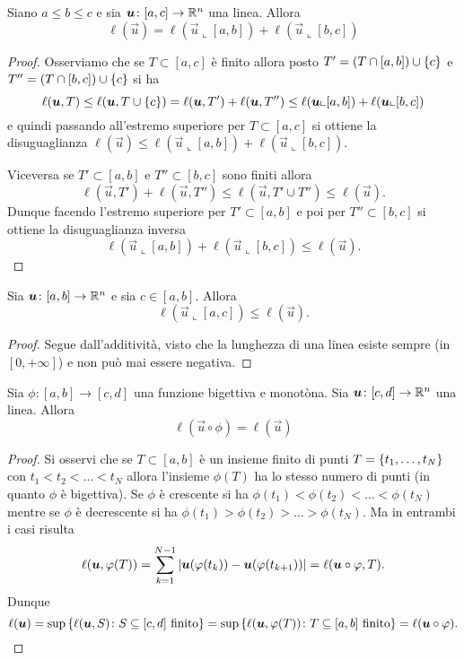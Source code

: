 \begin{theorem}
  Siano $a\le b \le c$ e sia $\boldsymbol u\colon [a,c]\to {\mathbb R}^n$ una linea.
  Allora%
  \begin{equation}\label{eq:ell_additivo}
  \ell(\vec u ) = \ell(\vec u\llcorner[a,b]) + \ell(\vec u\llcorner[b,c])  
  \end{equation}
\end{theorem}
\begin{proof}
Osserviamo che se $T\subset[a,c]$ è finito allora 
posto $T'=(T\cap[a,b])\cup{\left\{ c \right\}}$ e $T''=(T\cap[b,c])\cup {\left\{ c \right\}}$
si ha
\[
\ell(\boldsymbol u, T) \le \ell(\boldsymbol u, T\cup{\left\{ c \right\}})
=\ell(\boldsymbol u,T') + \ell(\boldsymbol u,T'')  
\le \ell(\boldsymbol u\llcorner [a,b]) + \ell(\boldsymbol u\llcorner [b,c])
\]
e quindi passando all'estremo superiore per $T\subset [a,c]$ 
si ottiene la disuguaglianza
$\ell(\vec u)\le \ell(\vec u\llcorner [a,b]) + \ell(\vec u\llcorner[b,c])$.

Viceversa se $T'\subset [a,b]$ e $T''\subset [b,c]$ sono finiti 
allora 
\[
 \ell(\vec u, T') + \ell(\vec u, T'')
 \le \ell(\vec u, T'\cup T'') \le \ell(\vec u).
\]
Dunque facendo l'estremo superiore per $T'\subset [a,b]$ 
e poi per $T''\subset [b,c]$ si ottiene la disuguaglianza
inversa
\[
  \ell(\vec u\llcorner[a,b]) + \ell(\vec u\llcorner[b,c])
  \le \ell(\vec u).
\]
\end{proof}

\begin{corollary}[monotonia]
Sia $\boldsymbol u\colon[a,b]\to {\mathbb R}^n$ e sia $c\in [a,b]$. Allora 
\[
\ell(\vec u \llcorner [a,c]) \le \ell(\vec u).  
\]
\end{corollary}
\begin{proof}
Segue dall'additività, visto che la lunghezza di una linea
esiste sempre (in $[0,+\infty]$) e non può mai essere negativa.
\end{proof}

\begin{theorem}[riparametrizzazione]
Sia $\phi\colon [a,b] \to [c,d]$ una funzione bigettiva e monotòna.
Sia $\boldsymbol u \colon [c,d]\to {\mathbb R}^n$ una linea.
Allora 
\[
 \ell(\vec u \circ \phi) = \ell(\vec u)  
\]
\end{theorem}
\begin{proof}
Si osservi che se $T\subset [a,b]$ è un insieme 
finito di punti $T={\left\{ t_1, \dots, t_N \right\}}$ con 
$t_1 < t_2 < \dots < t_N$ allora 
l'insieme $\phi(T)$ ha lo stesso numero di punti (in quanto 
$\phi$ è bigettiva). 
Se $\phi$ è crescente si ha 
$\phi(t_1) < \phi(t_2) < \dots < \phi(t_N)$  
mentre se $\phi$ è decrescente si ha 
$\phi(t_1) > \phi(t_2) > \dots > \phi(t_N)$. 
Ma in entrambi i casi risulta 
\[
  \ell(\boldsymbol u, \varphi(T)) 
  = \sum_{k=1}^{N-1} {\left|\boldsymbol u(\varphi(t_k)) - \boldsymbol u(\varphi(t_{k+1}))\right|} 
  = \ell(\boldsymbol u \circ \varphi, T).
\]
Dunque 
\[
\ell(\boldsymbol u) 
= \sup{\left\{ \ell(\boldsymbol u, S)\colon S\subseteq[c,d] \text{ finito} \right\}} 
= \sup{\left\{ \ell(\boldsymbol u,\varphi(T))\colon T\subseteq[a,b] \text{ finito}  \right\}}
= \ell(\boldsymbol u\circ \varphi).
\]
\end{proof}

